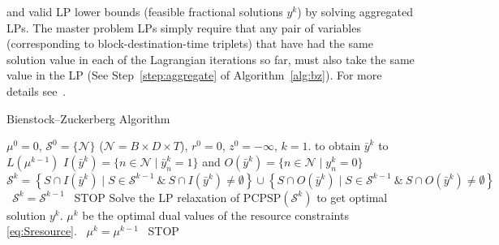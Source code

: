 \documentclass[authoryear,11pt,square,number,times,super,comma]{elsarticle}
\begin{document}
and valid LP lower bounds (feasible fractional solutions $y^k$) by solving aggregated LPs. The master problem LPs simply require that any pair of 
variables (corresponding to block-destination-time triplets) that have had the same solution value in each of the 
Lagrangian iterations so far, must also take the same value in the LP (See Step~\ref{step:aggregate} of Algorithm~\ref{alg:bz}).  For more 
details see~\cite{zuckerberg2010}. 
\begin{algorithm}[h!]
\def\IFstop#1{\State \algorithmicif\ #1 \algorithmicthen\ STOP}
\caption{{\sf Bienstock--Zuckerberg Algorithm}} \label{alg:bz}
\begin{algorithmic}[1]
 $\mu^{0}=0$, $\mathcal{S}^{0} = \lbrace \mathcal{N}\rbrace$ ($\mathcal{N}=B\times D\times T$), $r^0=0$, $z^{0} = - \infty$, $k=1$.
   to obtain $\bar y^k$ to $L(\mu ^{k-1})$ 
   $I(\bar y^k) = \{ n \in \mathcal{N} \mid \bar y^k_n = 1 \}$ and $O(\bar y^k) = \lbrace n \in \mathcal{N} \mid y^k_n = 0 \rbrace$
   $\mathcal{S}^k=\left\{S\cap I(\bar y^k) \mid S\in\mathcal{S}^{k-1}\ \&\ S\cap I(\bar y^k)\ne\emptyset\right\} \cup \left\{S\cap O(\bar y^k) \mid S\in\mathcal{S}^{k-1}\ \&\  S\cap O(\bar y^k)\ne\emptyset\right\}$
  \IFstop{$\mathcal{S}^k=\mathcal{S}^{k-1}$}
  \State Solve the LP relaxation of PCPSP$(\mathcal{S}^k)$ 
  to get optimal solution $y^k$.  \label{step:aggregate}
  \State {}
   $\mu^k$ be the optimal dual values of the resource constraints \eqref{eq:Sresource}.
  \IFstop{$\mu^k = \mu^{k-1}$} 
 \EndFor
\end{algorithmic}
\end{algorithm}
\end{document}
